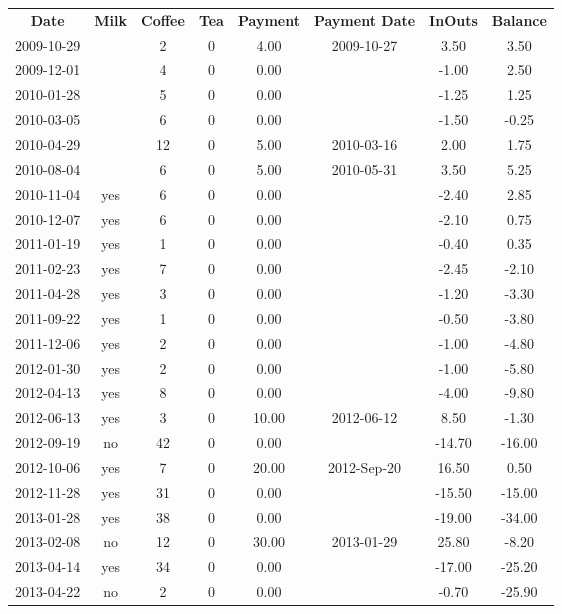 \begin{center}
\begin{tabular}{cccccccc}
\textbf{Date} & \textbf{Milk} & \textbf{Coffee} & \textbf{Tea} & \textbf{Payment} & \textbf{Payment Date} & \textbf{InOuts} & \textbf{Balance} \\
2009-10-29 &  &  2 & 0 &  4.00 & 2009-10-27 &   3.50 &   3.50\\ 
2009-12-01 &  &  4 & 0 &  0.00 &  &  -1.00 &   2.50\\ 
2010-01-28 &  &  5 & 0 &  0.00 &  &  -1.25 &   1.25\\ 
2010-03-05 &  &  6 & 0 &  0.00 &  &  -1.50 &  -0.25\\ 
2010-04-29 &  & 12 & 0 &  5.00 & 2010-03-16 &   2.00 &   1.75\\ 
2010-08-04 &  &  6 & 0 &  5.00 & 2010-05-31 &   3.50 &   5.25\\ 
2010-11-04 & yes &  6 & 0 &  0.00 &  &  -2.40 &   2.85\\ 
2010-12-07 & yes &  6 & 0 &  0.00 &  &  -2.10 &   0.75\\ 
2011-01-19 & yes &  1 & 0 &  0.00 &  &  -0.40 &   0.35\\ 
2011-02-23 & yes &  7 & 0 &  0.00 &  &  -2.45 &  -2.10\\ 
2011-04-28 & yes &  3 & 0 &  0.00 &  &  -1.20 &  -3.30\\ 
2011-09-22 & yes &  1 & 0 &  0.00 &  &  -0.50 &  -3.80\\ 
2011-12-06 & yes &  2 & 0 &  0.00 &  &  -1.00 &  -4.80\\ 
2012-01-30 & yes &  2 & 0 &  0.00 &  &  -1.00 &  -5.80\\ 
2012-04-13 & yes &  8 & 0 &  0.00 &  &  -4.00 &  -9.80\\ 
2012-06-13 & yes &  3 & 0 & 10.00 & 2012-06-12 &   8.50 &  -1.30\\ 
2012-09-19 & no & 42 & 0 &  0.00 &  & -14.70 & -16.00\\ 
2012-10-06 & yes &  7 & 0 & 20.00 & 2012-Sep-20 &  16.50 &   0.50\\ 
2012-11-28 & yes & 31 & 0 &  0.00 &  & -15.50 & -15.00\\ 
2013-01-28 & yes & 38 & 0 &  0.00 &  & -19.00 & -34.00\\ 
2013-02-08 & no & 12 & 0 & 30.00 & 2013-01-29 &  25.80 &  -8.20\\ 
2013-04-14 & yes & 34 & 0 &  0.00 &  & -17.00 & -25.20\\ 
2013-04-22 & no &  2 & 0 &  0.00 &  &  -0.70 & -25.90
\end{tabular}
\end{center}

